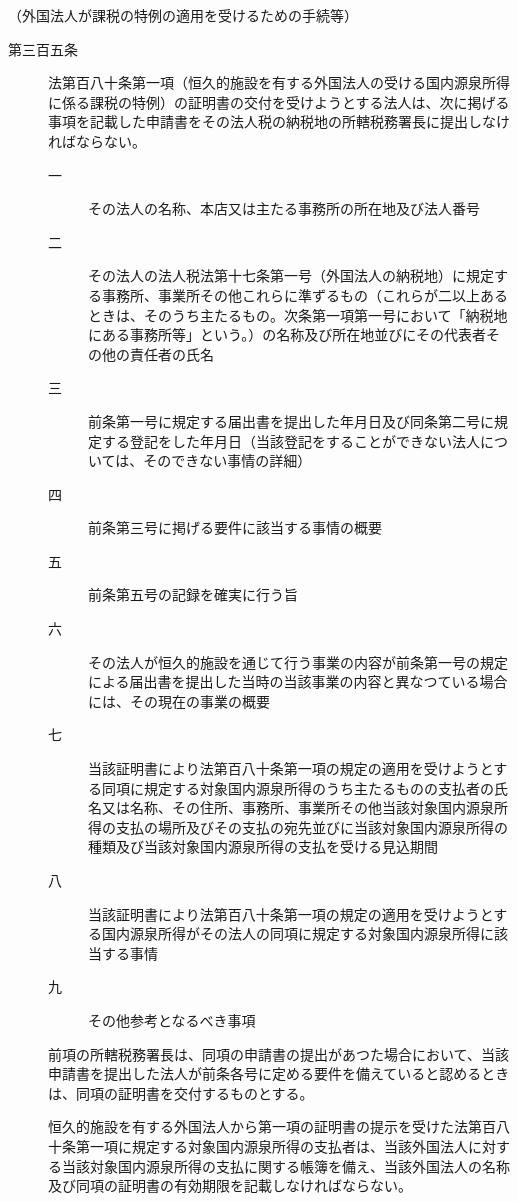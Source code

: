 \documentclass[twocolumn,a4j,10pt]{ltjtarticle}
\begin{document}
\noindent\hspace{10pt}（外国法人が課税の特例の適用を受けるための手続等）
\begin{description}
\item[第三百五条]法第百八十条第一項（恒久的施設を有する外国法人の受ける国内源泉所得に係る課税の特例）の証明書の交付を受けようとする法人は、次に掲げる事項を記載した申請書をその法人税の納税地の所轄税務署長に提出しなければならない。
\begin{description}
\item[一]その法人の名称、本店又は主たる事務所の所在地及び法人番号
\item[二]その法人の法人税法第十七条第一号（外国法人の納税地）に規定する事務所、事業所その他これらに準ずるもの（これらが二以上あるときは、そのうち主たるもの。次条第一項第一号において「納税地にある事務所等」という。）の名称及び所在地並びにその代表者その他の責任者の氏名
\item[三]前条第一号に規定する届出書を提出した年月日及び同条第二号に規定する登記をした年月日（当該登記をすることができない法人については、そのできない事情の詳細）
\item[四]前条第三号に掲げる要件に該当する事情の概要
\item[五]前条第五号の記録を確実に行う旨
\item[六]その法人が恒久的施設を通じて行う事業の内容が前条第一号の規定による届出書を提出した当時の当該事業の内容と異なつている場合には、その現在の事業の概要
\item[七]当該証明書により法第百八十条第一項の規定の適用を受けようとする同項に規定する対象国内源泉所得のうち主たるものの支払者の氏名又は名称、その住所、事務所、事業所その他当該対象国内源泉所得の支払の場所及びその支払の宛先並びに当該対象国内源泉所得の種類及び当該対象国内源泉所得の支払を受ける見込期間
\item[八]当該証明書により法第百八十条第一項の規定の適用を受けようとする国内源泉所得がその法人の同項に規定する対象国内源泉所得に該当する事情
\item[九]その他参考となるべき事項
\end{description}
\item[]前項の所轄税務署長は、同項の申請書の提出があつた場合において、当該申請書を提出した法人が前条各号に定める要件を備えていると認めるときは、同項の証明書を交付するものとする。
\item[]恒久的施設を有する外国法人から第一項の証明書の提示を受けた法第百八十条第一項に規定する対象国内源泉所得の支払者は、当該外国法人に対する当該対象国内源泉所得の支払に関する帳簿を備え、当該外国法人の名称及び同項の証明書の有効期限を記載しなければならない。
\end{description}
\end{document}
